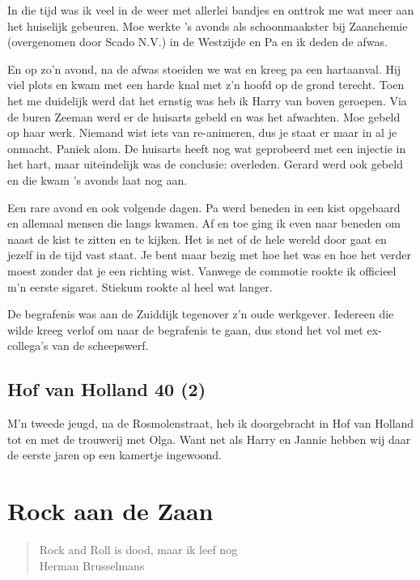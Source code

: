 \documentclass[12pt,twoside]{memoir}
\begin{document}
In die tijd was ik veel in de weer met allerlei bandjes en onttrok me wat meer aan het huiselijk gebeuren. Moe werkte ’s avonds als schoonmaakster bij Zaanchemie (overgenomen door Scado N.V.) in de Westzijde en Pa en ik deden de afwas. 

En op zo’n avond, na de afwas stoeiden we wat en kreeg pa een hartaanval. Hij viel plots en kwam met een harde knal met z’n hoofd op de grond terecht. Toen het me duidelijk werd dat het ernstig was heb ik Harry van boven geroepen. Via de buren Zeeman werd er de huisarts gebeld en was het afwachten. Moe gebeld op haar werk. Niemand wist iets van re-animeren, dus je staat er maar in al je onmacht. Paniek alom. De huisarts heeft nog wat geprobeerd met een injectie in het hart, maar uiteindelijk was de conclusie: overleden. Gerard werd ook gebeld en die kwam ’s avonds laat nog aan. 

Een rare avond en ook volgende dagen. Pa werd beneden in een kist opgebaard en allemaal mensen die langs kwamen. Af en toe ging ik even naar beneden om naast de kist te zitten en te kijken. Het is net of de hele wereld door gaat en jezelf in de tijd vast staat. Je bent maar bezig met hoe het was en hoe het verder moest zonder dat je een richting wist. Vanwege de commotie rookte ik officieel m’n eerste sigaret. Stiekum rookte al heel wat langer.

De begrafenis was aan de Zuiddijk tegenover z’n oude werkgever. Iedereen die wilde kreeg verlof om naar de begrafenis te gaan, dus stond het vol met ex-collega’s van de scheepswerf. 

\chapter{Hof van Holland 40 (2)} %
\label{cha:hofvanholland2}

M’n tweede jeugd, na de Rosmolenstraat, heb ik doorgebracht in Hof van Holland tot en met de trouwerij met Olga. Want net als Harry en Jannie hebben wij daar de eerste jaren op een kamertje ingewoond.

\part{Rock aan de Zaan}

\begin{quote}
Rock and Roll is dood, maar ik leef nog \\
Herman Brusselmans
\end{quote}
\end{document}
